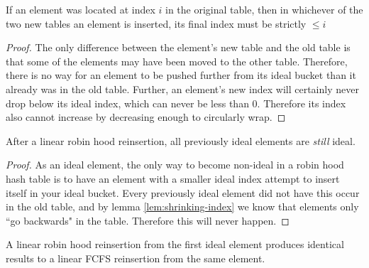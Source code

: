 \documentclass{cccg13}
\begin{document}
\begin{lemma} \label{lem:shrinking-index}
  If an element was located at index $i$ in the original table, then in
  whichever of the two new tables an element is inserted, its final index must
  be strictly $\leq i$
\end{lemma}

\begin{proof}
  The only difference between the element's new table and the old table is
  that some of the elements may have been moved to the other table. Therefore,
  there is no way for an element to be pushed further from its ideal bucket
  than it already was in the old table. Further, an element's new index will
  certainly never drop below its ideal index, which can never be less than
  $0$. Therefore its index also cannot increase by decreasing enough to
  circularly wrap.
\end{proof}

\begin{lemma} \label{lem:still-ideal}
  After a linear robin hood reinsertion, all previously ideal elements are
  \emph{still} ideal.
\end{lemma}

\begin{proof}
   As an ideal element, the only way to become non-ideal in a robin hood hash
   table is to have an element with a smaller ideal index attempt to insert
   itself in your ideal bucket. Every previously ideal element did not have
   this occur in the old table, and by lemma \ref{lem:shrinking-index} we know
   that elements only ``go backwards" in the table. Therefore this will never
   happen.
\end{proof}

\begin{theorem}
  A linear robin hood reinsertion from the first ideal element produces
  identical results to a linear FCFS reinsertion from the same element.
\end{theorem}
\end{document}
